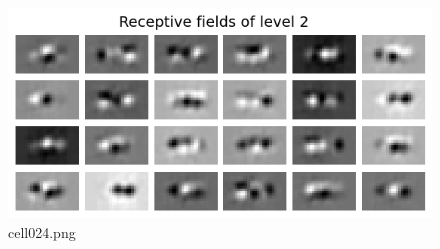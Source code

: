 \begin{figure}[ht]
	\centering
	\includegraphics[scale=0.8, max width=\linewidth]{./fig/energy-based-model/predictive-coding/cell024.png}
	\caption{cell024.png}
	\label{cell024.png}
\end{figure}
